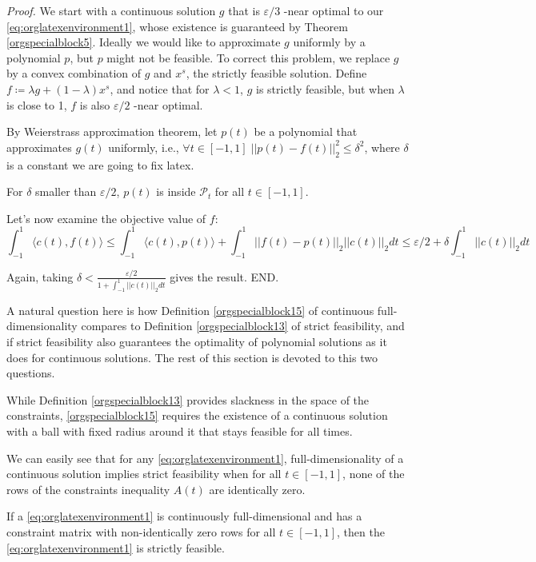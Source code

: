 \documentclass[moor]{informs1}
\renewenvironment{proof}{\emph{Proof.}}{END.}
\begin{document}
\begin{proof}
We start with a continuous solution \(g\) that is \(\varepsilon/3\) -near optimal to our \ref{eq:orglatexenvironment1},  whose existence is guaranteed by Theorem \ref{orgspecialblock5}. Ideally we would like to approximate \(g\) uniformly by a polynomial \(p\), but \(p\) might not be feasible. To correct this problem, we replace \(g\) by a convex combination of \(g\) and \(x^s\), the strictly feasible solution. Define \(f \coloneqq \lambda g + (1-\lambda) x^s\), and notice that for \(\lambda < 1\), \(g\) is strictly feasible, but when \(\lambda\) is close to 1, \(f\) is also \(\varepsilon/2\) -near optimal. 


By Weierstrass approximation theorem, let \(p(t)\) be a polynomial that approximates \(g(t)\) uniformly, i.e., \(\forall t \in [-1, 1] \; ||p(t) - f(t)||_2^2  \le \delta^2\), where \(\delta\) is a constant we are going to fix latex.

For \(\delta\) smaller than \(\varepsilon/2\), \(p(t)\) is inside \(\mathcal P_t\) for all \(t \in [-1, 1]\).

Let's now examine the objective value of \(f\):
$$\int_{-1}^1 \langle c(t), f(t)\rangle \le  \int_{-1}^1 \langle c(t), p(t)\rangle + \int_{-1}^1 ||f(t) - p(t)||_2 ||c(t)||_2 dt \le \varepsilon/2 + \delta \int_{-1}^1 ||c(t)||_2 dt$$

Again, taking \(\delta < \frac{\varepsilon/2}{1+\int_{-1}^1 ||c(t)||_2 dt}\) gives the result.
\end{proof}



A natural question here is how Definition \ref{orgspecialblock15} of continuous full-dimensionality compares to Definition \ref{orgspecialblock13} of strict feasibility, and if strict feasibility also guarantees the optimality of polynomial solutions as it does for continuous solutions. The rest of this section is devoted to this two questions.

While Definition \ref{orgspecialblock13} provides slackness in the space of the constraints, \ref{orgspecialblock15} requires the existence of a continuous solution with a ball with fixed radius around it that stays feasible for all times.

We can easily see that for any \ref{eq:orglatexenvironment1}, full-dimensionality of a continuous solution implies strict feasibility when for all \(t \in [-1, 1]\), none of the rows of the constraints inequality \(A(t)\) are identically zero.

\begin{thm}
If a \ref{eq:orglatexenvironment1} is continuously full-dimensional and has a constraint matrix with non-identically zero rows for all \(t \in [-1, 1]\), then the \ref{eq:orglatexenvironment1} is strictly feasible.
\end{thm}
\end{document}
